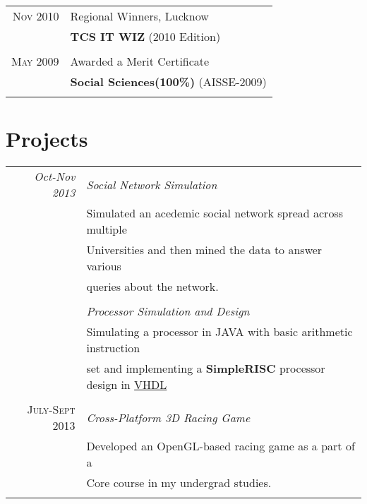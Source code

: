 \documentclass[10pt]{article} %
\begin{document}
{\begin{minipage}[t]{0.5\textwidth}
\begin{tabular}{rl}
\textsc{Nov} 2010 & Regional Winners, Lucknow\\
& \textbf{TCS IT WIZ }\footnotesize(2010 Edition)\normalsize\\\\

\textsc{May} 2009 & Awarded a Merit Certificate \\
& \textbf{Social Sciences(100\%) }\footnotesize(AISSE-2009)\normalsize\\\\

\end{tabular}


\section{Projects}

\begin{tabular}{r|p{11cm}}
\emph{Oct-Nov 2013} &  \emph{Social Network Simulation}\\
& \footnotesize{Simulated an acedemic social network spread across multiple} \\
& \footnotesize{Universities and then mined the data to answer various}\\
& \footnotesize{queries about the network.}\\
\multicolumn{2}{c}{} \\


 &  \emph{Processor Simulation and Design}\\
& \footnotesize{Simulating a processor in JAVA with basic arithmetic instruction}\\
& \footnotesize{set and implementing a \textbf{SimpleRISC} processor design in \href{https://github.com/knsn1994/processor/}{VHDL}}\\
\multicolumn{2}{c}{} \\

\textsc{July-Sept 2013} &  \emph{Cross-Platform 3D Racing Game}\\
& \footnotesize{Developed an OpenGL-based racing game as a part of a }\\
& \footnotesize{Core course in my undergrad studies.}\\
\multicolumn{2}{c}{} \\


\end{tabular}
\end{minipage}}
\end{document}
